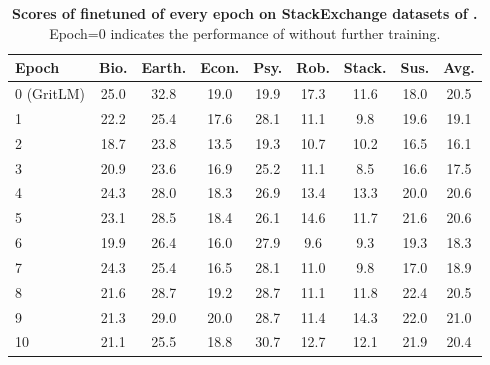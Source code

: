 \begin{table}[htbp]
\centering
\caption{\textbf{Scores of finetuned \grit of every epoch on StackExchange datasets of \ours.} Epoch=0 indicates the performance of \grit without further training.}
\begin{tabular}{l|ccccccc|c}
\toprule
\textbf{Epoch} & \textbf{Bio.} & \textbf{Earth.} & \textbf{Econ.} & \textbf{Psy.} & \textbf{Rob.} & \textbf{Stack.} & \textbf{Sus.} & \textbf{Avg.} \\
\midrule
0 (GritLM) & 25.0 & 32.8 & 19.0 & 19.9 & 17.3 & 11.6 & 18.0 & 20.5\\
1 & 22.2 & 25.4 & 17.6 & 28.1 & 11.1 & 9.8 & 19.6 & 19.1 \\
2 & 18.7 & 23.8 & 13.5 & 19.3 & 10.7 & 10.2 & 16.5 & 16.1 \\
3 & 20.9 & 23.6 & 16.9 & 25.2 & 11.1 & 8.5 & 16.6 & 17.5 \\
4 & 24.3 & 28.0 & 18.3 & 26.9 & 13.4 & 13.3 & 20.0 & 20.6 \\
5 & 23.1 & 28.5 & 18.4 & 26.1 & 14.6 & 11.7 & 21.6 & 20.6 \\
6 & 19.9 & 26.4 & 16.0 & 27.9 & 9.6 & 9.3 & 19.3 & 18.3 \\
7 & 24.3 & 25.4 & 16.5 & 28.1 & 11.0 & 9.8 & 17.0 & 18.9 \\
8 & 21.6 & 28.7 & 19.2 & 28.7 & 11.1 & 11.8 & 22.4 & 20.5 \\
9 & 21.3 & 29.0 & 20.0 & 28.7 & 11.4 & 14.3 & 22.0 & 21.0 \\
10 & 21.1 & 25.5 & 18.8 & 30.7 & 12.7 & 12.1 & 21.9 & 20.4\\
\bottomrule
\end{tabular}
\label{tab:robustness_details}
\end{table}